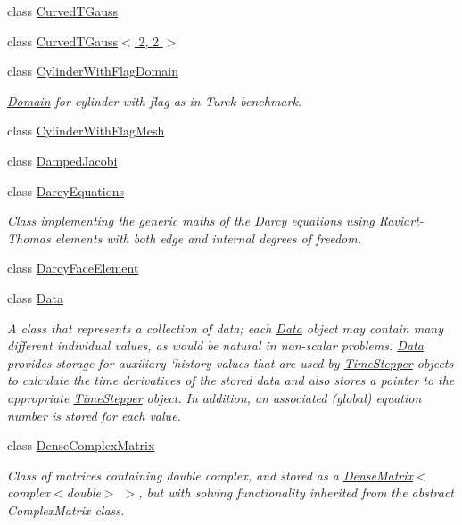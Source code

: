 \begin{DoxyCompactItemize}
class \hyperlink{classoomph_1_1CurvedTGauss}{Curved\+T\+Gauss}
\item 
class \hyperlink{classoomph_1_1CurvedTGauss_3_012_00_012_01_4}{Curved\+T\+Gauss$<$ 2, 2 $>$}
\item 
class \hyperlink{classoomph_1_1CylinderWithFlagDomain}{Cylinder\+With\+Flag\+Domain}
\begin{DoxyCompactList}\small\item\em \hyperlink{classoomph_1_1Domain}{Domain} for cylinder with flag as in Turek benchmark. \end{DoxyCompactList}\item 
class \hyperlink{classoomph_1_1CylinderWithFlagMesh}{Cylinder\+With\+Flag\+Mesh}
\item 
class \hyperlink{classoomph_1_1DampedJacobi}{Damped\+Jacobi}
\item 
class \hyperlink{classoomph_1_1DarcyEquations}{Darcy\+Equations}
\begin{DoxyCompactList}\small\item\em Class implementing the generic maths of the Darcy equations using Raviart-\/\+Thomas elements with both edge and internal degrees of freedom. \end{DoxyCompactList}\item 
class \hyperlink{classoomph_1_1DarcyFaceElement}{Darcy\+Face\+Element}
\item 
class \hyperlink{classoomph_1_1Data}{Data}
\begin{DoxyCompactList}\small\item\em A class that represents a collection of data; each \hyperlink{classoomph_1_1Data}{Data} object may contain many different individual values, as would be natural in non-\/scalar problems. \hyperlink{classoomph_1_1Data}{Data} provides storage for auxiliary `history\textquotesingle{} values that are used by \hyperlink{classoomph_1_1TimeStepper}{Time\+Stepper} objects to calculate the time derivatives of the stored data and also stores a pointer to the appropriate \hyperlink{classoomph_1_1TimeStepper}{Time\+Stepper} object. In addition, an associated (global) equation number is stored for each value. \end{DoxyCompactList}\item 
class \hyperlink{classoomph_1_1DenseComplexMatrix}{Dense\+Complex\+Matrix}
\begin{DoxyCompactList}\small\item\em Class of matrices containing double complex, and stored as a \hyperlink{classoomph_1_1DenseMatrix}{Dense\+Matrix}$<$complex$<$double$>$ $>$, but with solving functionality inherited from the abstract Complex\+Matrix class. \end{DoxyCompactList}\item 

\end{DoxyCompactItemize}

